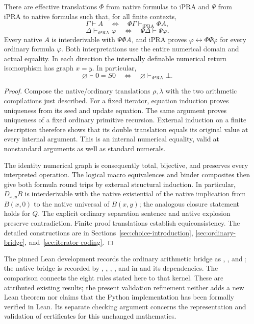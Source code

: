 \begin{theorem}
\label{thm:inherited-biinterpretation}
There are effective translations $\Phi$ from native formulas to iPRA and
$\Psi$ from iPRA to native formulas such that, for all finite contexts,
\[
 \Gamma\vdash A
 \quad\Longleftrightarrow\quad
 \Phi\Gamma\vdash_{\mathrm{iPRA}}\Phi A,
\]
\[
 \Delta\vdash_{\mathrm{iPRA}}\varphi
 \quad\Longleftrightarrow\quad
 \Psi\Delta\vdash\Psi\varphi.
\]
Every native $A$ is interderivable with $\Psi\Phi A$, and iPRA proves
$\varphi\leftrightarrow\Phi\Psi\varphi$ for every ordinary formula
$\varphi$. Both interpretations use the entire numerical domain and actual
equality. In each direction the internally definable numerical return
isomorphism has graph $x=y$. In particular,
\[
 \varnothing\vdash 0=S0
 \quad\Longleftrightarrow\quad
 \varnothing\vdash_{\mathrm{iPRA}}\bot.
\]
\end{theorem}

\begin{proof}
Compose the native/ordinary translations $\rho,\lambda$ with the two
arithmetic compilations just described. For a fixed iterator, equation
induction proves uniqueness from its seed and update equation. The same
argument proves uniqueness of a fixed ordinary primitive recursion.
External induction on a finite description therefore shows that its double
translation equals its original value at every internal argument. This is
an internal numerical equality, valid at nonstandard arguments as well as
standard numerals.

The identity numerical graph is consequently total, bijective, and preserves
every interpreted operation. The logical macro equivalences and binder
composites then give both formula round trips by external structural
induction. In particular, $D_{x,y}B$ is interderivable with the native
existential of the native implication from $B(x,0)$ to the native universal
of $B(x,y)$; the analogous closure statement holds for $Q$. The explicit
ordinary separation sentence and native explosion preserve contradiction.
Finite proof translations establish equiconsistency. The detailed
constructions are in Sections~\ref{sec:choice-introduction},
\ref{sec:ordinary-bridge}, and~\ref{sec:iterator-coding}.
\end{proof}

The pinned Lean development records the ordinary arithmetic bridge as
, , and
; the native bridge is recorded by
, ,
, , and
 in
 and its dependencies.
The comparison  connects the eight rules stated here
to that kernel. These are attributed existing results; the present
validation refinement neither adds a new Lean theorem nor claims that the
Python implementation has been formally verified in Lean. Its separate
checking argument concerns the representation and validation of certificates
for this unchanged mathematics.
